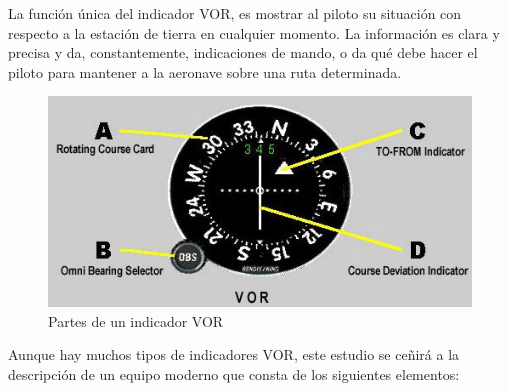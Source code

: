 La función única del indicador VOR, es mostrar al piloto su situación con respecto a la estación de tierra en cualquier momento. La información es clara y precisa y da, constantemente, indicaciones de mando, o da qué debe hacer el piloto para mantener a la aeronave sobre una ruta determinada. 

\begin{figure}[!htb]
  \centering
  \includegraphics[width=\textwidth]{Imagenes/06.02.vor.imagenes/vor_indicator.eps}
  \caption{Partes de un indicador VOR}
  \label{fig:indicador-vor}
\end{figure}

Aunque hay muchos tipos de indicadores VOR, este estudio se ce\~nir\'a a la descripci\'on de un equipo moderno que consta de los siguientes elementos:

